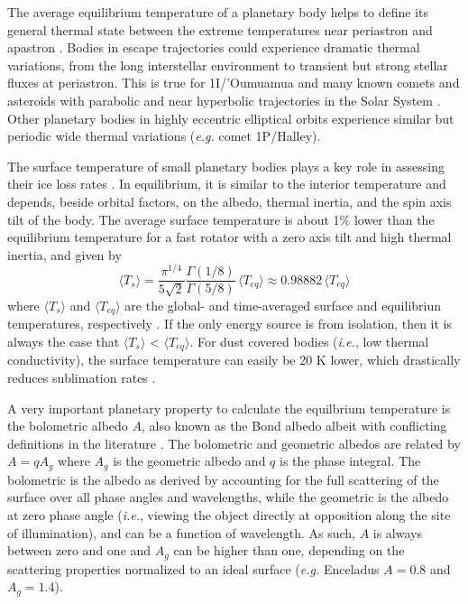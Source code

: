 \documentclass[a4paper,fleqn,usenatbib]{mnras}
\begin{document}
The average equilibrium temperature of a planetary body helps to define its general thermal state between the extreme temperatures near periastron and apastron \citep{2017ApJ...837L...1M}. Bodies in escape trajectories could experience dramatic thermal variations, from the long interstellar environment to transient but strong stellar fluxes at periastron. This is true for 1I/'Oumuamua and many known comets and asteroids with parabolic and near hyperbolic trajectories in the Solar System \citep{SSD(2018)}. Other planetary bodies in highly eccentric elliptical orbits experience similar but periodic wide thermal variations (\emph{e.g.} comet 1P/Halley).

The surface temperature of small planetary bodies plays a key role in assessing their ice loss rates \citep{2018arXiv180201293S}. In equilibrium, it is similar to the interior temperature and depends, beside orbital factors, on the albedo, thermal inertia, and the spin axis tilt of the body. The average surface temperature is about 1\% lower than the equilibrium temperature for a fast rotator with a zero axis tilt and high thermal inertia, and given by
\begin{equation} \label{eq:Ts}
\langle T_s \rangle = \frac{\pi^{1/4}}{5\sqrt{2}} \frac{\Gamma(1/8)}{\Gamma(5/8)} \, \langle T_{eq} \rangle \approx 0.98882 \, \langle T_{eq} \rangle
\end{equation}
where $\langle T_s \rangle$ and $\langle T_{eq} \rangle$ are the global- and time-averaged surface and equilibriun temperatures, respectively \citep{2018arXiv180201293S}. If the only energy source is from isolation, then it is
always the case that $\langle T_s \rangle$ < $\langle T_{eq} \rangle$. For dust covered bodies (\emph{i.e.}, low thermal conductivity), the surface temperature
can easily be 20 K lower, which drastically reduces sublimation rates \citep{2008ApJ...682..697S, 2016Icar..276...88S}.

A very important planetary property to calculate the equilbrium temperature is the bolometric albedo $A$, also known as the Bond albedo albeit with conflicting definitions in the literature \citep{1916PNAS....2...74R, 1981A&A...104...42H}. The bolometric and geometric albedos are related by $A = qA_g$ where $A_g$ is the geometric albedo and $q$ is the phase integral. The bolometric is the albedo as derived by accounting for the full scattering of the surface over all phase angles and wavelengths, while the geometric is the albedo at zero phase angle (\emph{i.e.}, viewing the object directly at opposition along the site of illumination), and can be a function of wavelength. As such, $A$ is always between zero and one and $A_g$ can be higher than one, depending on the scattering properties normalized to an ideal surface (\emph{e.g.} Enceladus $A=0.8$ and $A_g=1.4$).
\end{document}
